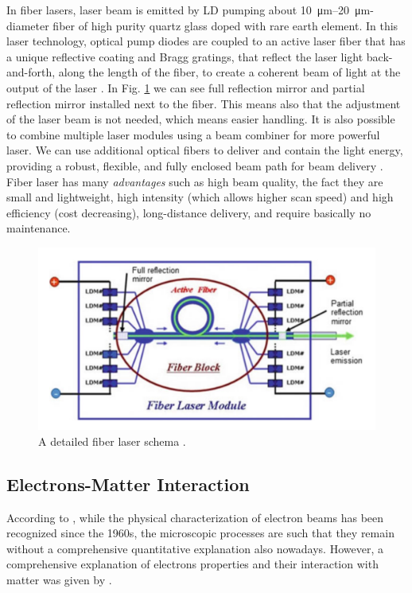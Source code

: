 In fiber lasers, laser beam is emitted by LD pumping about \SIrange[range-phrase=--]{10}{20}{\micro\metre}-diameter fiber of high purity  quartz glass doped with  rare earth element. In this laser technology, optical pump diodes are coupled to an active laser fiber that has a unique reflective coating and Bragg gratings, that reflect the laser light back-and-forth, along the length of the fiber, to create a coherent beam of light at the output of the laser \cite{milewski_additive_2017}. In Fig. \ref{fig:detailedfiber} we can see full reflection mirror and partial reflection mirror installed next to the fiber. This means also that the adjustment of the laser beam is not needed, which means easier handling. It is also possible to combine multiple laser modules using a beam combiner for more powerful laser. We can use additional optical fibers to deliver and contain the light energy, providing a robust, flexible, and fully enclosed beam path for beam delivery \cite{milewski_additive_2017}. Fiber laser has many \textit{advantages} such as high beam quality, the fact they are small and lightweight, high intensity (which allows higher scan speed) and high efficiency (cost decreasing), long-distance delivery, and require basically no maintenance. 
\begin{figure}[H]
    \centering
    \includegraphics[scale=0.4]{Images/detailedfiber.png}
    \caption[Fiber laser schema.]{A detailed fiber laser schema \cite{katayama_fundamentals_2020}.}
    \label{fig:detailedfiber}
\end{figure}
\subsection{Electrons-Matter Interaction}
\label{subsec:ebminter}
According to \citeauthor{schultz_h_electron_1994}, while the physical characterization of electron beams has been recognized since the 1960s, the microscopic processes are such that they remain without a comprehensive quantitative explanation also nowadays. However, a comprehensive explanation of electrons properties and their interaction with matter was given by \citeauthor{krumeich_properties_nodate}.
